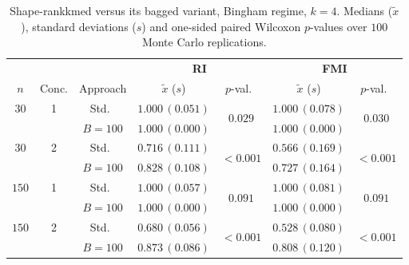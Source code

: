 \documentclass[11pt,a4paper]{article}
\begin{document}
\begin{table}[h]
\centering
\caption{Shape-rankkmed versus its bagged variant, Bingham regime, $k=4$. Medians ($\tilde x$), standard deviations ($s$) and one-sided paired Wilcoxon $p$-values over $100$ Monte Carlo replications.}
\label{tab:rkm-bing-k4}
\footnotesize
\begin{tabular}{cc c cc cc}
\toprule
& & & \multicolumn{2}{c}{\textbf{RI}} & \multicolumn{2}{c}{\textbf{FMI}} \\
\cmidrule(lr){4-5}\cmidrule(lr){6-7}
$n$ & Conc. & Approach & $\tilde x$ ($s$) & $p$-val.\ & $\tilde x$ ($s$) & $p$-val.\ \\
\midrule
$30$ & 1 & Std.\ & $1.000\,(0.051)$ & \multirow{2}{*}{$\mathbf{0.029}$} & $1.000\,(0.078)$ & \multirow{2}{*}{$\mathbf{0.030}$} \\
     &   & $B{=}100$ & $1.000\,(0.000)$ & & $1.000\,(0.000)$ & \\
$30$ & 2 & Std.\ & $0.716\,(0.111)$ & \multirow{2}{*}{$\mathbf{<\!0.001}$} & $0.566\,(0.169)$ & \multirow{2}{*}{$\mathbf{<\!0.001}$} \\
     &   & $B{=}100$ & $0.828\,(0.108)$ & & $0.727\,(0.164)$ & \\
$150$ & 1 & Std.\ & $1.000\,(0.057)$ & \multirow{2}{*}{$0.091$} & $1.000\,(0.081)$ & \multirow{2}{*}{$0.091$} \\
     &   & $B{=}100$ & $1.000\,(0.000)$ & & $1.000\,(0.000)$ & \\
$150$ & 2 & Std.\ & $0.680\,(0.056)$ & \multirow{2}{*}{$\mathbf{<\!0.001}$} & $0.528\,(0.080)$ & \multirow{2}{*}{$\mathbf{<\!0.001}$} \\
     &   & $B{=}100$ & $0.873\,(0.086)$ & & $0.808\,(0.120)$ & \\
\bottomrule
\end{tabular}
\end{table}
\end{document}
